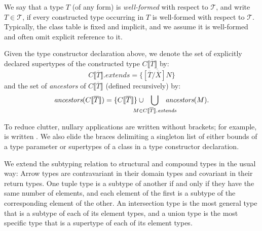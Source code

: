 \documentclass[10pt]{sigplanconf}
\newcommand{\TODO}[1]{\textbf{\emph{\textcolor{red}{TODO}}}: \textsf{\footnotesize #1}}
\renewcommand{\bar}{\overline}
\newcommand{\ancestors}{\textit{ancestors}}
\newcommand{\myextends}[1]{{#1}.\textit{extends}}
\newcommand{\subtypeof}{\ensuremath{<:}}
\newcommand{\arrowtype}[2]{\mbox{\ensuremath{{#1} \rightarrow {#2}}}}
\newcommand{\tuple}[1]{\ensuremath{#1}}
\newcommand{\obb}[1]{\ensuremath{\llbracket \bar{#1} \rrbracket}}
\newcommand{\substb}[2]{\ensuremath{[\bar{#1}/\bar{#2}]}}
\newcommand{\T}{\ensuremath{\mathcal{T}}}
\begin{document}
We say that a type $T$ (of any form) is \emph{well-formed} 
with respect to $\T$, 
and write $T \in \T$, 
if every constructed type occurring in $T$ is well-formed with respect to $\T$.
Typically, the class table is fixed and implicit, 
and we assume it is well-formed 
and often omit explicit reference to it.

Given %
the type constructor declaration above, 
we denote the set of explicitly declared supertypes 
of the constructed type $C\obb{T}$ by:
\[
\myextends{C\obb{T}} = \{ \bar{\substb{T}{X}N} \}
\]
and the set of \emph{ancestors} of $C\obb{T}$ 
(defined recursively) by:
\[
\ancestors(C\obb{T}) 
   = \{C\obb{T}\} \cup 
     \hspace*{-4ex} \bigcup_{M \in \myextends{C\obb{T}}} \hspace{-4ex} \ancestors(M).
\]

To reduce clutter, 
nullary applications are written without brackets; 
for example,  is written . 
We also elide the braces delimiting 
a singleton list of either bounds of a type parameter 
or supertypes of a class in a type constructor declaration.

We extend the subtyping relation to
structural and compound types in the usual way:
Arrow types are contravariant in their domain types 
and covariant in their return types. 
One tuple type is a subtype of another 
if and only if they have the same number of elements, 
and each element of the first is a subtype of the corresponding element of the other. 
An intersection type is the most general type 
that is a subtype of each of its element types, 
and a union type is the most specific type 
that is a supertype of each of its element types.
\end{document}
